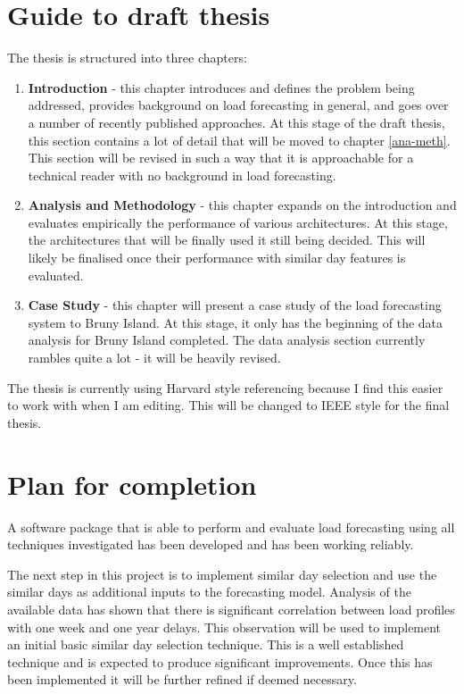 \section{Guide to draft thesis}
The thesis is structured into three chapters:
\begin{enumerate}
	\item \textbf{Introduction} - this chapter introduces and defines the problem being addressed, provides background on load forecasting in general, and goes over a number of recently published approaches. 
	At this stage of the draft thesis, this section contains a lot of detail that will be moved to chapter \ref{ana-meth}.
	This section will be revised in such a way that it is approachable for a technical reader with no background in load forecasting.
	\item \textbf{Analysis and Methodology} - this chapter expands on the introduction and evaluates empirically the performance of various architectures.
	At this stage, the architectures that will be finally used it still being decided.
	This will likely be finalised once their performance with similar day features is evaluated.
	\item \textbf{Case Study} - this chapter will present a case study of the load forecasting system to Bruny Island.
	At this stage, it only has the beginning of the data analysis for Bruny Island completed.
	The data analysis section currently rambles quite a lot - it will be heavily revised.
\end{enumerate}

The thesis is currently using Harvard style referencing because I find this easier to work with when I am editing.
This will be changed to IEEE style for the final thesis.

\section{Plan for completion}
A software package that is able to perform and evaluate load forecasting using all techniques investigated has been developed and has been working reliably.

The next step in this project is to implement similar day selection and use the similar days as additional inputs to the forecasting model.
Analysis of the available data has shown that there is significant correlation between load profiles with one week and one year delays.
This observation will be used to implement an initial basic similar day selection technique.
This is a well established technique and is expected to produce significant improvements.
Once this has been implemented it will be further refined if deemed necessary.

